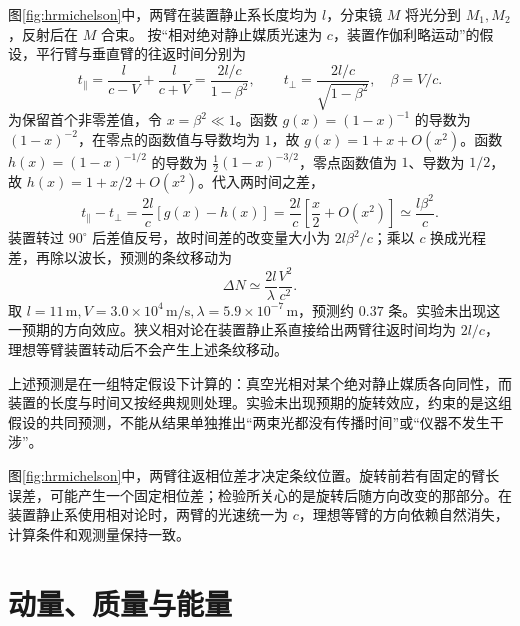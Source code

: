 图\ref{fig:hrmichelson}中，两臂在装置静止系长度均为 $l$，分束镜 $M$ 将光分到 $M_1,M_2$，反射后在 $M$ 合束。
按“相对绝对静止媒质光速为 $c$，装置作伽利略运动”的假设，平行臂与垂直臂的往返时间分别为
\[
t_\parallel=\frac l{c-V}+\frac l{c+V}
=\frac{2l/c}{1-\beta^2},\qquad
t_\perp=\frac{2l/c}{\sqrt{1-\beta^2}},\quad \beta=V/c.
\]
为保留首个非零差值，令 $x=\beta^2\ll1$。函数 $g(x)=(1-x)^{-1}$ 的导数为 $(1-x)^{-2}$，在零点的函数值与导数均为 $1$，故 $g(x)=1+x+O(x^2)$。函数 $h(x)=(1-x)^{-1/2}$ 的导数为 $\tfrac12(1-x)^{-3/2}$，零点函数值为 $1$、导数为 $1/2$，故 $h(x)=1+x/2+O(x^2)$。代入两时间之差，
\[
 t_\parallel-t_\perp=\frac{2l}{c}[g(x)-h(x)]
 =\frac{2l}{c}\left[\frac x2+O(x^2)\right]\simeq\frac{l\beta^2}{c}.
\]
装置转过 $90^\circ$ 后差值反号，故时间差的改变量大小为 $2l\beta^2/c$；乘以 $c$ 换成光程差，再除以波长，预测的条纹移动为
\[
\Delta N\simeq\frac{2l}{\lambda}\frac{V^2}{c^2}.
\]
取 $l=11\,\mathrm m,V=3.0\times10^4\,\mathrm{m/s},\lambda=5.9\times10^{-7}\,\mathrm m$，预测约 $0.37$ 条。实验未出现这一预期的方向效应。狭义相对论在装置静止系直接给出两臂往返时间均为 $2l/c$，理想等臂装置转动后不会产生上述条纹移动。

上述预测是在一组特定假设下计算的：真空光相对某个绝对静止媒质各向同性，而装置的长度与时间又按经典规则处理。实验未出现预期的旋转效应，约束的是这组假设的共同预测，不能从结果单独推出“两束光都没有传播时间”或“仪器不发生干涉”。

图\ref{fig:hrmichelson}中，两臂往返相位差才决定条纹位置。旋转前若有固定的臂长误差，可能产生一个固定相位差；检验所关心的是旋转后随方向改变的那部分。在装置静止系使用相对论时，两臂的光速统一为 $c$，理想等臂的方向依赖自然消失，计算条件和观测量保持一致。

\section{动量、质量与能量}


